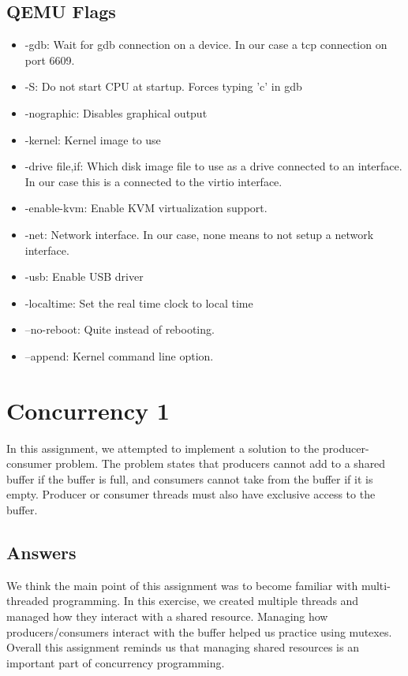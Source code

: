 \documentclass[journal, letterpaper, draftclsnofoot, onecolumn, 10pt]{IEEEtran}
\begin{document}
\subsection{QEMU Flags}
\begin{itemize}
  \item -gdb: Wait for gdb connection on a device. In our case a tcp connection on port 6609.
  \item -S: Do not start CPU at startup. Forces typing 'c' in gdb
  \item -nographic: Disables graphical output
  \item -kernel: Kernel image to use
  \item -drive file,if: Which disk image file to use as a drive connected to an interface. In our case this is a connected to the virtio interface.
  \item -enable-kvm: Enable KVM virtualization support.
  \item -net: Network interface. In our case, none means to not setup a network interface.
  \item -usb: Enable USB driver
  \item -localtime: Set the real time clock to local time
  \item --no-reboot: Quite instead of rebooting.
  \item --append: Kernel command line option.
\end{itemize}
\clearpage
\section{Concurrency 1}
In this assignment, we attempted to implement a solution to the producer-consumer problem. The problem states that producers cannot
add to a shared buffer if the buffer is full, and consumers cannot take from the buffer if it is empty. Producer or consumer threads
must also have exclusive access to the buffer.

\subsection{Answers}
We think the main point of this assignment was to become familiar with multi-threaded programming. In this exercise, we
created multiple threads and managed how they interact with a shared resource. Managing how producers/consumers interact
with the buffer helped us practice using mutexes. Overall this assignment reminds us that managing shared resources is an
important part of concurrency programming.
\end{document}
